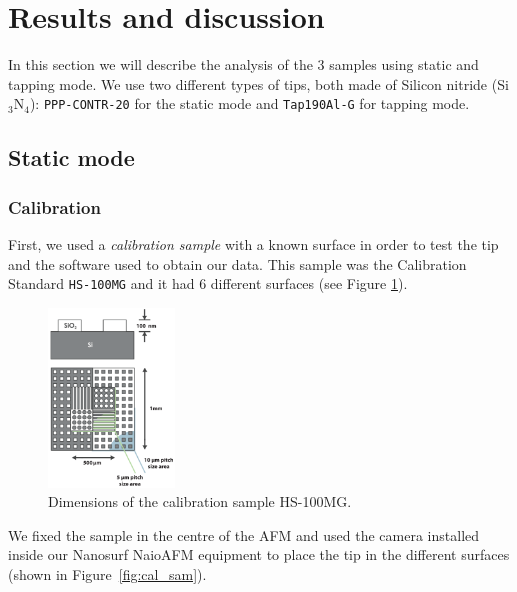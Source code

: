 \documentclass[11pt,a4paper]{article}
\begin{document}
\newpage
\section{Results and discussion}
In this section we will describe the analysis of the 3 samples using static and tapping mode. We use two different types of tips, both made of Silicon nitride (Si$_3$N$_4$): \texttt{PPP-CONTR-20} for the static mode and \texttt{Tap190Al-G} for tapping mode.

\subsection{Static mode}
\subsubsection{Calibration}
First, we used a \emph{calibration sample} with a known surface in order to test the tip and the software used to obtain our data. This sample was the Calibration Standard \texttt{HS-100MG} and it had 6 different surfaces (see Figure \ref{fig:HS-100MG}).

\begin{figure}[H]
\centering
\includegraphics[width=0.3\textwidth]{HS-100MG}
\caption{Dimensions of the calibration sample HS-100MG.}
\label{fig:HS-100MG}
\end{figure}

We fixed the sample in the centre of the AFM and used the camera installed inside our Nanosurf NaioAFM equipment to place the tip in the different surfaces (shown in Figure~\ref{fig:cal_sam}).
\end{document}
